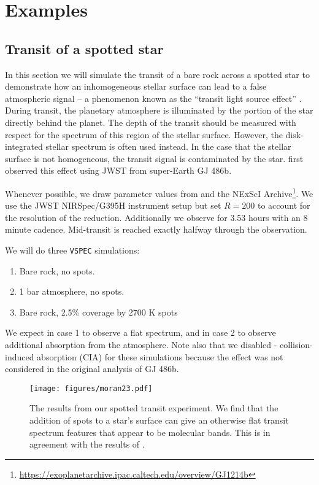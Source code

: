 \documentclass[twocolumn]{aastex631}
\newcommand{\vspec}[1]{\texttt{VSPEC}#1}
\begin{document}
\section{Examples \label{sec:examples}}

\subsection{Transit of a spotted star}

In this section we will simulate the transit of a bare rock across a spotted star to demonstrate how an inhomogeneous
stellar surface can lead to a false atmospheric signal -- a phenomenon known as the ``transit light source effect'' \citep{rackham2018}.
During transit, the planetary atmosphere is illuminated by the portion of the star directly behind the planet. The depth of the transit
should be measured with respect for the spectrum of this region of the stellar surface. However, the disk-integrated stellar spectrum is often used instead.
In the case that the stellar surface is not homogeneous, the transit signal is contaminated by the star.
\citet{moran2023} first observed this effect using JWST from super-Earth GJ 486b.

Whenever possible, we draw parameter values from \citet{moran2023} and the NExScI Archive\footnote{\url{https://exoplanetarchive.ipac.caltech.edu/overview/GJ1214b}}.
We use the JWST NIRSpec/G395H instrument setup but set $R=200$ to account for the resolution of the reduction.
Additionally we observe for 3.53 hours with an 8 minute cadence. Mid-transit is reached exactly halfway through the observation.

We will do three \vspec{} simulations:
\begin{enumerate}
    \item Bare rock, no spots.
    \item 1 bar  atmosphere, no spots.
    \item Bare rock, 2.5\% coverage by 2700 K spots
\end{enumerate}

We expect in case 1 to observe a flat spectrum, and in case 2 to observe additional
absorption from the  atmosphere. Note also that we disabled - collision-induced absorption (CIA) for
these simulations because the effect was not considered in the original analysis of GJ 486b.

\begin{figure}
    \centering
    \texttt{[image: figures/moran23.pdf]}
    \caption{
        The results from our spotted transit experiment. We find that the addition of
        spots to a star's surface can give an otherwise flat transit spectrum features that appear to be molecular bands.
        This is in agreement with the results of \citet{moran2023}.
        }
    \label{fig:moran_transit}
\end{figure}
\end{document}
